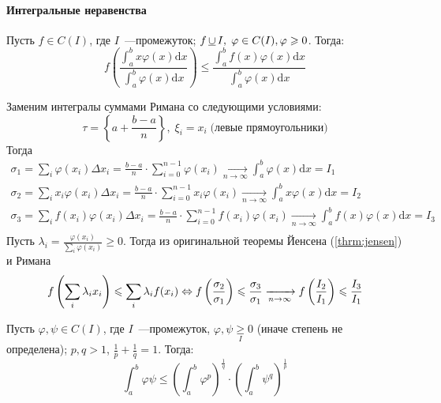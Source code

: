 \documentclass[12pt]{../../notes}
\begin{document}
\paragraph{Интегральные неравенства}

\begin{stat}\label{stat:intjensen}
  Пусть $f \in C(I)$, где $I$~---промежуток; $f \,\underline\cup\, I,\; \varphi \in C(I), \varphi \geqslant 0$.
  Тогда:
  \[
    f\left( \frac{\int_a^b x \varphi(x) \mathrm{d}x}{\int_a^b \varphi(x) \mathrm{d}x} \right) 
    \leqslant
    \frac{\int_a^b f(x) \varphi(x) \mathrm{d}x}{\int_a^b \varphi(x) \mathrm{d}x}
  \]
\end{stat}
\begin{ittproof}
  Заменим интегралы суммами Римана со следующими условиями:
  \[
    \tau = \left\{ a + \frac{b - a}{n} \right\},\; \xi_i = x_i\;\text{(левые прямоугольники)}
  \]
  Тогда \begin{align*}
    \sigma_1 = \sum_i \varphi(x_i)\Delta x_i = \frac{b - a}{n}\cdot\sum_{i=0}^{n-1}\varphi(x_i) 
    \xrightarrow[n\to\infty]{} \int_a^b \varphi(x)\mathrm{d}x = I_1 \\
    \sigma_2 = \sum_i x_i \varphi(x_i)\Delta x_i = \frac{b-a}{n}\cdot\sum_{i=0}^{n-1}x_i\varphi(x_i) 
    \xrightarrow[n\to\infty]{} \int_a^b x\varphi(x)\mathrm{d}x = I_2 \\
    \sigma_3 = \sum_i f(x_i)\varphi(x_i)\Delta x_i = 
    \frac{b-a}{n}\cdot\sum_{i=0}^{n-1}f(x_i)\varphi(x_i) \xrightarrow[n\to\infty]{} 
    \int_a^b f(x)\varphi(x)\mathrm{d}x = I_3 \\
  \end{align*}
  Пусть $\lambda_i = \frac{\varphi(x_i)}{\sum_i\varphi(x_i)} \geqslant 0$.
  Тогда из оригинальной теоремы Йенсена (\ref{thrm:jensen}) и Римана
  \[
    f\left( \sum_i \lambda_i x_i \right) \leqslant \sum_i \lambda_i f(x_i) \Leftrightarrow
    f\left( {\sigma_2\over \sigma_1} \right) \leqslant {\sigma_3\over\sigma_1}
    \xrightarrow[n\to\infty]{} f\left( {I_2\over I_1} \right) \leqslant {I_3\over I_1}
  \]\nopagebreak%
\end{ittproof}

\begin{stat}\label{stat:intgeld}
  Пусть $\varphi,\psi \in C(I)$, где $I$~---промежуток, $\varphi,\psi \underset{I}{\geqslant} 0$ 
  (иначе степень не определена);
  $p,q > 1$, $\frac{1}{p} + \frac{1}{q} = 1$.
  Тогда:
  \begin{equation*}
    \int_a^b \varphi \psi \leqslant 
      \left( \int_a^b \varphi^p \right)^\frac{1}{q} \cdot \left( \int_a^b \psi^q \right)^\frac{1}{p} 
  \end{equation*}
\end{stat}
\end{document}
